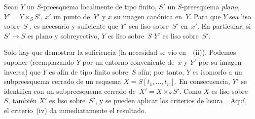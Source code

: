 \begin{corollaire}
\label{II.4.13}
Sean $Y$ un $S$-preesquema localmente de tipo finito, $S'$ un $S$-preesquema \emph{plano}, $Y'=Y\times_S S'$, $x'$ un punto de~$Y'$ y $x$ su imagen canónica en~$Y$. Para que $Y$ sea liso sobre~$S$
,
es necesario y suficiente que $Y'$ sea liso sobre~$S'$ en~$x'$. En particular, si $S'\to S$ es plano y sobreyectivo, $Y$ es liso sobre~$S$
$Y'$ es liso sobre~$S'$.
\end{corollaire}

Solo hay que demostrar la suficiencia (la necesidad se vio en~~(ii)). Podemos suponer (reemplazando $Y$ por un entorno conveniente de~$x$ y $Y'$ por su imagen inversa) que $Y$ es afín de tipo finito sobre~$S$ afín; por tanto, $Y$ es isomorfo a un subpreesquema cerrado de un esquema $X=S[t_1,\dots,t_n]$. En consecuencia, $Y'$ se identifica con un subpreesquema cerrado de~$X'=X\times_S S'$. Como $X$ es liso sobre~$S$, también $X'$ es liso sobre~$S'$, y se pueden aplicar los criterios de lisura~. Aquí, el criterio~(iv) da inmediatamente el resultado.
